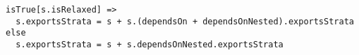 \lstset{frame=tb, aboveskip=12pt, belowskip=-3pt, breaklines=true, basicstyle=\small\ttfamily, tabsize=2, mathescape=true}
\begin{lstlisting}[caption={base\_facts.als, lines 20-23}, label=alloy:exports, captionpos=b]
isTrue[s.isRelaxed] =>
  s.exportsStrata = s + s.(dependsOn + dependsOnNested).exportsStrata
else
  s.exportsStrata = s + s.dependsOnNested.exportsStrata
\end{lstlisting}
